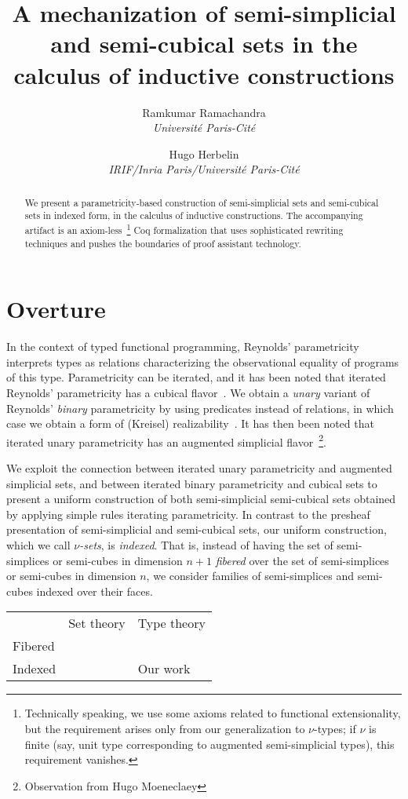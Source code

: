 \documentclass[10pt]{art.cls/art}
\title{A mechanization of semi-simplicial and semi-cubical sets in the calculus of inductive constructions}
\author{
  \textcolor{gray80}{Ramkumar Ramachandra} \\
  \itshape \textcolor{gray80}{Université Paris-Cité}
  \and
  \textcolor{gray80}{Hugo Herbelin} \\
  \itshape \textcolor{gray80}{IRIF/Inria Paris/Université Paris-Cité}
}
\date{}
\def\graymidrule{\arrayrulecolor{gray30}\midrule\arrayrulecolor{gray65}}
\begin{document}
\maketitle
\begin{abstract}
  We present a parametricity-based construction of semi-simplicial sets and semi-cubical sets in indexed form, in the calculus of inductive constructions. The accompanying artifact is an axiom-less~\footnote{Technically speaking, we use some axioms related to functional extensionality, but the requirement arises only from our generalization to $\nu$-types; if $\nu$ is finite (say, unit type corresponding to augmented semi-simplicial types), this requirement vanishes.} Coq formalization that uses sophisticated rewriting techniques and pushes the boundaries of proof assistant technology.
\end{abstract}
\tableofcontents
\newpage

\section{Overture}
In the context of typed functional programming, Reynolds' parametricity~\cite{reynolds72} interprets types as relations characterizing the observational equality of programs of this type. Parametricity can be iterated, and it has been noted that iterated Reynolds' parametricity has a cubical flavor~\cite{johann17,altenkirch15,moulin16}. We obtain a \emph{unary} variant of Reynolds' \emph{binary} parametricity by using predicates instead of relations, in which case we obtain a form of (Kreisel) realizability~\cite{bernardy12,moulin16}. It has then been noted that iterated unary parametricity has an augmented simplicial flavor~\footnote{Observation from Hugo Moeneclaey}.

We exploit the connection between iterated unary parametricity and augmented simplicial sets, and between iterated binary parametricity and cubical sets to present a uniform construction of both semi-simplicial semi-cubical sets obtained by applying simple rules iterating parametricity.  In contrast to the presheaf presentation of semi-simplicial and semi-cubical sets, our uniform construction, which we call \emph{$\nu$-sets}, is \emph{indexed}. That is, instead of having the set of semi-simplices or semi-cubes in dimension $n+1$
\emph{fibered} over the set of semi-simplices or semi-cubes in dimension $n$, we consider families of semi-simplices and semi-cubes indexed over their faces.

\begin{table}[H]
  \begin{tabularx}{\linewidth}{p{.3\linewidth}|p{.3\linewidth}|p{.3\linewidth}}
    \toprule
            & Set theory  & Type theory \\
    \graymidrule
    Fibered & \cite{cchm} &             \\
    \graymidrule
    Indexed &             & Our work    \\
    \bottomrule
  \end{tabularx}
\end{table}
\end{document}
